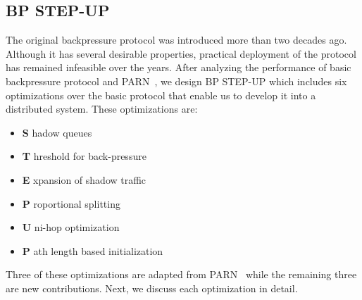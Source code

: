\subsection{BP STEP-UP}
The original backpressure protocol was introduced more than two decades ago. Although it has several desirable properties, practical deployment of the protocol has remained infeasible over the years. After analyzing the performance of basic backpressure protocol and PARN~\cite{Srikant3}, we design BP STEP-UP which includes six optimizations over the basic protocol that enable us to develop it into a distributed system. These optimizations are:
\begin{itemize}[noitemsep]
\item[] \textbf{\large S} hadow queues ~\cite{Srikant3}
\item[] \textbf{\large T} hreshold for back-pressure ~\cite{Srikant3}
\item[] \textbf{\large E} xpansion of shadow traffic ~\cite{Srikant3}
\item[] \textbf{\large P} roportional splitting \\
\item[] \textbf{\large U} ni-hop optimization
\item[] \textbf{\large P} ath length based initialization
\end{itemize}
Three of these optimizations are adapted from PARN~\cite{Srikant3} while the remaining three are new contributions. Next, we discuss each optimization in detail.


